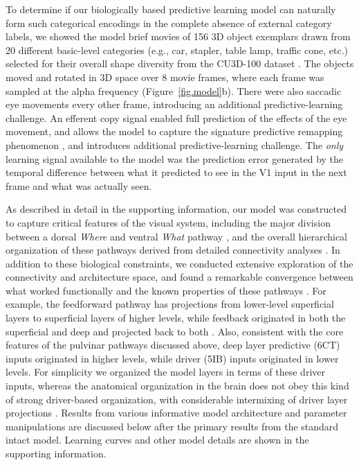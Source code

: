 \documentclass[11pt,twoside]{article}
\newif\myifpdf
\begin{document}
To determine if our biologically based predictive learning model can naturally form such categorical encodings in the complete absence of external category labels, we showed the model brief movies of 156 3D object exemplars drawn from 20 different basic-level categories (e.g., car, stapler, table lamp, traffic cone, etc.) selected for their overall shape diversity from the CU3D-100 dataset \cite{OReillyWyatteHerdEtAl13}.  The objects moved and rotated in 3D space over 8 movie frames, where each frame was sampled at the alpha frequency (Figure~\ref{fig.model}b).  There were also saccadic eye movements every other frame, introducing an additional predictive-learning challenge.  An efferent copy signal enabled full prediction of the effects of the eye movement, and allows the model to capture the signature predictive remapping phenomenon \cite{DuhamelColbyGoldberg92,CavanaghHuntAfrazEtAl10}, and introduces additional predictive-learning challenge.  The \emph{only} learning signal available to the model was the prediction error generated by the temporal difference between what it predicted to see in the V1 input in the next frame and what was actually seen.

As described in detail in the supporting information, our model was constructed to capture critical features of the visual system, including the major division between a dorsal \emph{Where} and ventral \emph{What} pathway \cite{UngerleiderMishkin82}, and the overall hierarchical organization of these pathways derived from detailed connectivity analyses \cite{RocklandPandya79,FellemanVanEssen91,MarkovVezoliChameauEtAl14,MarkovErcsey-RavaszGomesEtAl14}.  In addition to these biological constraints, we conducted extensive exploration of the connectivity and architecture space, and found a remarkable convergence between what worked functionally and the known properties of these pathways \cite{OReillyWyatteRohrlich17}.  For example, the feedforward pathway has projections from lower-level superficial layers to superficial layers of higher levels, while feedback originated in both the superficial and deep and projected back to both \cite{RocklandPandya79,FellemanVanEssen91}.  Also, consistent with the core features of the pulvinar pathways discussed above, deep layer predictive (6CT) inputs originated in higher levels, while driver (5IB) inputs originated in lower levels.  For simplicity we organized the model layers in terms of these driver inputs, whereas the anatomical organization in the brain does not obey this kind of strong driver-based organization, with considerable intermixing of driver layer projections \cite{Shipp03}.  Results from various informative model architecture and parameter manipulations are discussed below after the primary results from the standard intact model.  Learning curves and other model details are shown in the supporting information.
\end{document}

